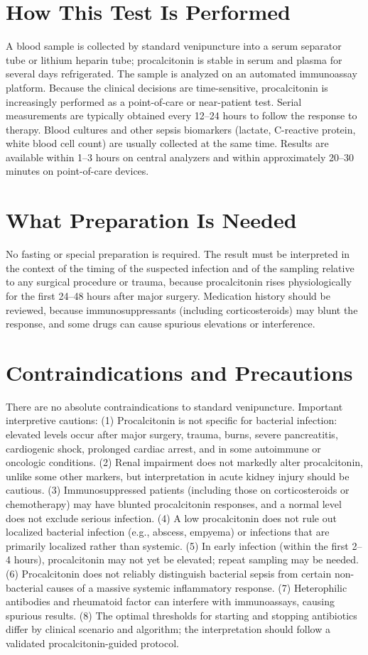 \section*{How This Test Is Performed}
A blood sample is collected by standard venipuncture into a serum separator tube or lithium heparin tube; procalcitonin is stable in serum and plasma for several days refrigerated. The sample is analyzed on an automated immunoassay platform. Because the clinical decisions are time-sensitive, procalcitonin is increasingly performed as a point-of-care or near-patient test. Serial measurements are typically obtained every 12--24 hours to follow the response to therapy. Blood cultures and other sepsis biomarkers (lactate, C-reactive protein, white blood cell count) are usually collected at the same time. Results are available within 1--3 hours on central analyzers and within approximately 20--30 minutes on point-of-care devices.

\section*{What Preparation Is Needed}
No fasting or special preparation is required. The result must be interpreted in the context of the timing of the suspected infection and of the sampling relative to any surgical procedure or trauma, because procalcitonin rises physiologically for the first 24--48 hours after major surgery. Medication history should be reviewed, because immunosuppressants (including corticosteroids) may blunt the response, and some drugs can cause spurious elevations or interference.

\section*{Contraindications and Precautions}
There are no absolute contraindications to standard venipuncture. Important interpretive cautions: (1) Procalcitonin is not specific for bacterial infection: elevated levels occur after major surgery, trauma, burns, severe pancreatitis, cardiogenic shock, prolonged cardiac arrest, and in some autoimmune or oncologic conditions. (2) Renal impairment does not markedly alter procalcitonin, unlike some other markers, but interpretation in acute kidney injury should be cautious. (3) Immunosuppressed patients (including those on corticosteroids or chemotherapy) may have blunted procalcitonin responses, and a normal level does not exclude serious infection. (4) A low procalcitonin does not rule out localized bacterial infection (e.g., abscess, empyema) or infections that are primarily localized rather than systemic. (5) In early infection (within the first 2--4 hours), procalcitonin may not yet be elevated; repeat sampling may be needed. (6) Procalcitonin does not reliably distinguish bacterial sepsis from certain non-bacterial causes of a massive systemic inflammatory response. (7) Heterophilic antibodies and rheumatoid factor can interfere with immunoassays, causing spurious results. (8) The optimal thresholds for starting and stopping antibiotics differ by clinical scenario and algorithm; the interpretation should follow a validated procalcitonin-guided protocol.

